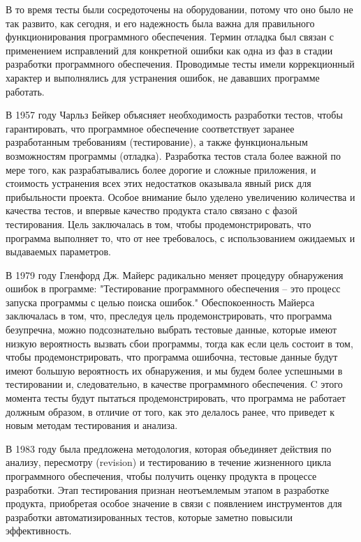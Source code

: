 В то время тесты были сосредоточены на оборудовании, потому что оно было не так развито, как 
сегодня, и его надежность была важна для правильного функционирования программного обеспечения.
Термин отладка был связан с применением исправлений для конкретной ошибки как одна из фаз в 
стадии разработки программного обеспечения. Проводимые тесты имели коррекционный характер и 
выполнялись для устранения ошибок, не дававших программе работать. 

В 1957 году Чарльз Бейкер объясняет необходимость разработки тестов, чтобы гарантировать, что 
программное обеспечение соответствует заранее разработанным требованиям (тестирование), а также 
функциональным возможностям программы (отладка)\cite{Baker}. Разработка тестов стала более важной по мере 
того, как разрабатывались более дорогие и сложные приложения, и стоимость устранения всех этих 
недостатков оказывала явный риск для прибыльности проекта. Особое внимание было уделено 
увеличению количества и качества тестов, и впервые качество продукта стало связано с фазой 
тестирования. Цель заключалась в том, чтобы продемонстрировать, что программа выполняет то, что 
от нее требовалось, с использованием ожидаемых и выдаваемых параметров.

В 1979 году Гленфорд Дж. Майерс радикально меняет процедуру обнаружения ошибок в программе:
"Тестирование программного обеспечения -- это процесс запуска программы с целью поиска ошибок."\cite{Myers1979}
Обеспокоенность Майерса заключалась в том, что, преследуя цель продемонстрировать, что программа 
безупречна, можно подсознательно выбрать тестовые данные, которые имеют низкую вероятность 
вызвать сбои программы, тогда как если цель состоит в том, чтобы продемонстрировать, что 
программа ошибочна, тестовые данные будут имеют большую вероятность их обнаружения, и мы будем 
более успешными в тестировании и, следовательно, в качестве программного обеспечения. C этого
момента тесты будут пытаться продемонстрировать, что программа не работает должным образом, в 
отличие от того, как это делалось ранее, что приведет к новым методам тестирования и анализа.

В 1983 году была предложена методология, которая объединяет действия по анализу, пересмотру 
(revision) и тестированию в течение жизненного цикла программного обеспечения, чтобы получить 
оценку продукта в процессе разработки. Этап тестирования признан неотъемлемым этапом в 
разработке продукта, приобретая особое значение в связи с появлением инструментов для разработки 
автоматизированных тестов, которые заметно повысили эффективность.

